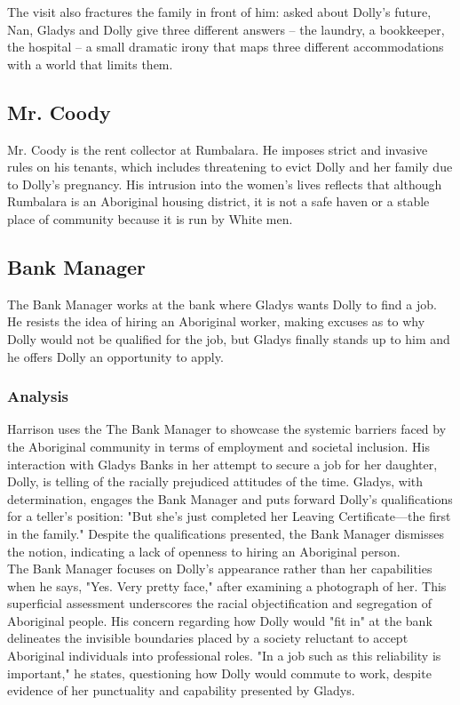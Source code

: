 \documentclass[a4paper]{article}
\begin{document}
The visit also fractures the family in front of him: asked about Dolly's future, Nan, Gladys and Dolly give three different answers -- the laundry, a bookkeeper, the hospital -- a small dramatic irony that maps three different accommodations with a world that limits them.\\

\subsection{Mr. Coody}
Mr. Coody is the rent collector at Rumbalara. He
imposes strict and invasive rules on his tenants, which includes
threatening to evict Dolly and her family due to Dolly’s
pregnancy. His intrusion into the women’s lives reflects that
although Rumbalara is an Aboriginal housing district, it is not a
safe haven or a stable place of community because it is run by
White men.\\

\subsection{Bank Manager}
The Bank Manager works at the bank where
Gladys wants Dolly to find a job. He resists the idea of hiring an
Aboriginal worker, making excuses as to why Dolly would not
be qualified for the job, but Gladys finally stands up to him and
he offers Dolly an opportunity to apply.\\

\subsubsection{Analysis}
Harrison uses the The Bank Manager to showcase the systemic barriers faced by the Aboriginal 
community in terms of employment and societal inclusion. His interaction with Gladys Banks in her 
attempt to secure a job for her daughter, Dolly, is telling of the racially prejudiced attitudes of 
the time. Gladys, with determination, engages the Bank Manager and puts forward Dolly's 
qualifications for a teller's position: "But she’s just completed her Leaving Certificate—the first 
in the family." Despite the qualifications presented, the Bank Manager dismisses the notion, 
indicating a lack of openness to hiring an Aboriginal person.\\

The Bank Manager focuses on Dolly's appearance rather than her capabilities when he says, "Yes. 
Very pretty face," after examining a photograph of her. This superficial assessment underscores the 
racial objectification and segregation of Aboriginal people. His concern regarding how Dolly would 
"fit in" at the bank delineates the invisible boundaries placed by a society reluctant to accept 
Aboriginal individuals into professional roles. "In a job such as this reliability is important," 
he states, questioning how Dolly would commute to work, despite evidence of her punctuality and 
capability presented by Gladys.\\
\end{document}
